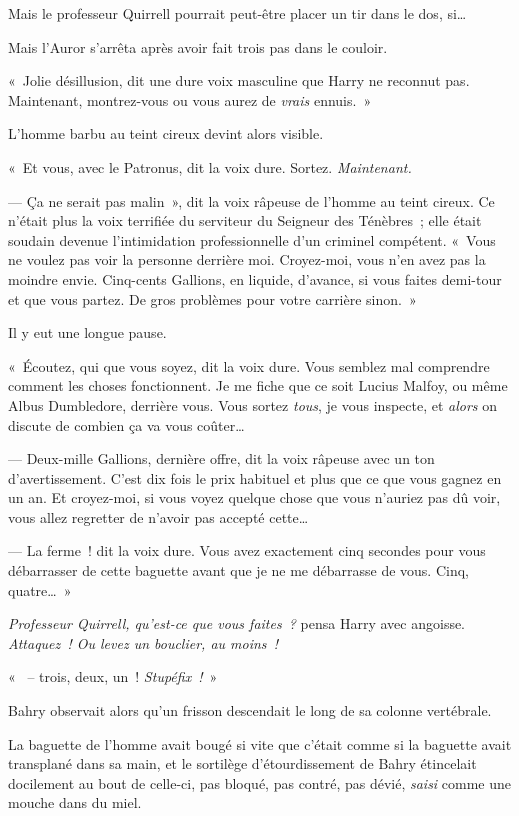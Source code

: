 Mais le professeur Quirrell pourrait peut-être placer un tir dans le dos, si…

Mais l'Auror s'arrêta après avoir fait trois pas dans le couloir.

«~Jolie désillusion, dit une dure voix masculine que Harry ne reconnut pas. Maintenant, montrez-vous ou vous aurez de \emph{vrais} ennuis.~»

L'homme barbu au teint cireux devint alors visible.

«~Et vous, avec le Patronus, dit la voix dure. Sortez. \emph{Maintenant.}

--- Ça ne serait pas malin~», dit la voix râpeuse de l'homme au teint cireux. Ce n'était plus la voix terrifiée du serviteur du Seigneur des Ténèbres~; elle était soudain devenue l'intimidation professionnelle d'un criminel compétent. «~Vous ne voulez pas voir la personne derrière moi. Croyez-moi, vous n'en avez pas la moindre envie. Cinq-cents Gallions, en liquide, d'avance, si vous faites demi-tour et que vous partez. De gros problèmes pour votre carrière sinon.~»

Il y eut une longue pause.

«~Écoutez, qui que vous soyez, dit la voix dure. Vous semblez mal comprendre comment les choses fonctionnent. Je me fiche que ce soit Lucius Malfoy, ou même Albus Dumbledore, derrière vous. Vous sortez \emph{tous}, je vous inspecte, et \emph{alors} on discute de combien ça va vous coûter…

--- Deux-mille Gallions, dernière offre, dit la voix râpeuse avec un ton d'avertissement. C'est dix fois le prix habituel et plus que ce que vous gagnez en un an. Et croyez-moi, si vous voyez quelque chose que vous n'auriez pas dû voir, vous allez regretter de n'avoir pas accepté cette…

--- La ferme~! dit la voix dure. Vous avez exactement cinq secondes pour vous débarrasser de cette baguette avant que je ne me débarrasse de vous. Cinq, quatre…~»

\emph{Professeur Quirrell, qu'est-ce que vous faites~?} pensa Harry avec angoisse. \emph{Attaquez~! Ou levez un bouclier, au moins~!}

«~ -- trois, deux, un~! \emph{Stupéfix~!}~»

\later

Bahry observait alors qu'un frisson descendait le long de sa colonne vertébrale.

La baguette de l'homme avait bougé si vite que c'était comme si la baguette avait transplané dans sa main, et le sortilège d'étourdissement de Bahry étincelait docilement au bout de celle-ci, pas bloqué, pas contré, pas dévié, \emph{saisi} comme une mouche dans du miel.

